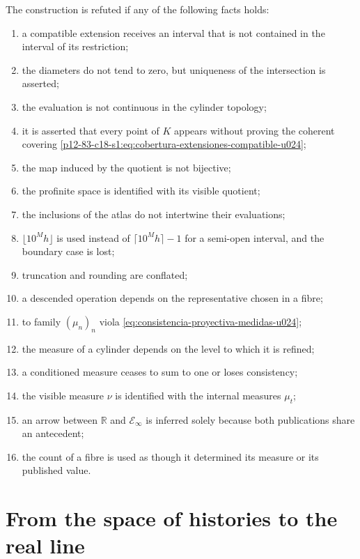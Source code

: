 \begin{criterion}
The construction is refuted if any of the following facts
holds:
\begin{enumerate}
 \item a compatible extension receives an interval that is not contained
       in the interval of its restriction;
 \item the diameters do not tend to zero, but uniqueness of the
       intersection is asserted;
 \item the evaluation is not continuous in the cylinder topology;
 \item it is asserted that every point of \(K\) appears without proving the coherent
       covering \eqref{p12-83-c18-s1:eq:cobertura-extensiones-compatible-u024};
 \item the map induced by the quotient is not bijective;
 \item the profinite space is identified with its visible quotient;
 \item the inclusions of the atlas do not intertwine their evaluations;
 \item \(\lfloor10^Mh\rfloor\) is used instead of
       \(\lceil10^Mh\rceil-1\) for a semi-open interval, and the
       boundary case is lost;
 \item truncation and rounding are conflated;
 \item a descended operation depends on the representative chosen in a
       fibre;
 \item to family \((\mu_n)_n\) viola
       \eqref{eq:consistencia-proyectiva-medidas-u024};
 \item the measure of a cylinder depends on the level to which it is refined;
 \item a conditioned measure ceases to sum to one or loses consistency;
 \item the visible measure \(\nu\) is identified with the internal measures
       \(\mu_t\);
 \item an arrow between \(\mathbb R\) and
       \(\mathcal E_\infty\) is inferred solely because both publications share an
       antecedent;
 \item the count of a fibre is used as though it determined its measure or its
       published value.
\end{enumerate}
\end{criterion}


\section{From the space of histories to the real line}

